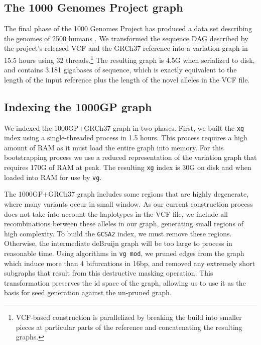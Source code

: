 \documentclass{article}
\begin{document}
\subsection{The 1000 Genomes Project graph}

The final phase of the 1000 Genomes Project has produced a data set describing the genomes of 2500 humans \cite{1000g2015}.
We transformed the sequence DAG described by the project's released VCF and the GRCh37 reference into a variation graph in 15.5 hours using 32 threads.\footnote{VCF-based construction is parallelized by breaking the build into smaller pieces at particular parts of the reference and concatenating the resulting graphs.}
The resulting graph is 4.5G when serialized to disk, and contains 3.181 gigabases of sequence, which is exactly equivalent to the length of the input reference plus the length of the novel alleles in the VCF file.

\subsection{Indexing the 1000GP graph}

We indexed the 1000GP+GRCh37 graph in two phases.
First, we built the {\tt xg} index using a single-threaded process in 1.5 hours.
This process requires a high amount of RAM as it must load the entire graph into memory. For this bootstrapping process we use a reduced representation of the variation graph that requires 170G of RAM at peak.
The resulting {\tt xg} index is 30G on disk and when loaded into RAM for use by {\tt vg}.

The 1000GP+GRCh37 graph includes some regions that are highly degenerate, where many variants occur in small window.
As our current construction process does not take into account the haplotypes in the VCF file, we include all recombinations between these alleles in our graph, generating small regions of high complexity.
To build the {\tt GCSA2} index, we must remove these regions. Otherwise, the intermediate deBruijn graph will be too large to process in reasonable time.
Using algorithms in {\tt vg mod}, we pruned edges from the graph which induce more than 4 bifurcations in 16bp, and removed any extremely short subgraphs that result from this destructive masking operation.
This transformation preserves the id space of the graph, allowing us to use it as the basis for seed generation against the un-pruned graph.
\end{document}
